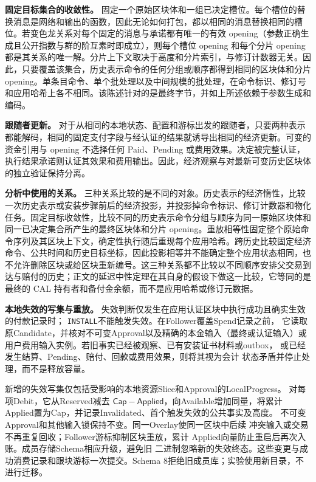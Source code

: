 \noindent\textbf{固定目标集合的收敛性。}
固定一个原始区块体和一组已决定槽位。每个槽位的替换消息是网络和输出的函数，因此无论如何打包，都以相同的消息替换相同的槽位。若变色龙关系对每个固定的消息与承诺都有唯一的有效 opening（参数正确生成且公开指数与群的阶互素时即成立），则每个槽位 opening 和每个分片 opening 都是其关系的唯一解。分片上下文取决于高度和分片索引，与修订计数器无关。因此，只要覆盖该集合，历史表示命令的任何分组或顺序都得到相同的区块体和分片 opening。单条目命令、单个批处理以及中间规模的批处理，在命令标识、修订号和应用哈希上各不相同。该陈述针对的是最终字节，并如上所述依赖于参数生成和编码。

\noindent\textbf{跟随者更新。}
对于从相同的本地状态、配置和游标出发的跟随者，只要两种表示都能解码，相同的固定支付字段与经认证的结果就诱导出相同的经济更新。可变的资金引用与 opening 不选择任何 Paid、Pending 或费用效果。决定被完整认证，执行结果承诺则认证其效果和费用输出。因此，经济观察与对最新可变历史区块体的独立验证保持分离。

\noindent\textbf{分析中使用的关系。}
三种关系比较的是不同的对象。历史表示的经济惰性，比较一次历史表示或安装步骤前后的经济投影，并投影掉命令标识、修订计数器和物化任务。固定目标收敛性，比较不同的历史表示命令分组与顺序为同一原始区块体和同一已决定集合所产生的最终区块体和分片 opening。重放相等性固定整个原始命令序列及其区块上下文，确定性执行随后重现每个应用哈希。跨历史比较固定经济命令、公共时间和历史目标坐标，因此投影相等并不能确定整个应用状态相同，也不允许删除区块或给区块重新编号。这三种关系都不比较以不同顺序安排父交易到达与赔付的历史；正文的延迟中性定理在其自身的假设下做这一比较，它等同的是最终的 CAL 持有者和备付金余额，而不是应用哈希或修订元数据。

\noindent\textbf{本地失效的写集与重放。}
失效判断仅发生在应用认证区块中执行成功且确实生效的付款记录时；
\texttt{INSTALL}不能触发失效。在Follower覆盖Spend记录之前，
它读取原Candidate，并核对不可变Approval以及精确的本金输入（最终或认证输入）或
用户费用输入实例。若旧事实已经被观察、已有安装证书材料或outbox，
或已经发生结算、Pending、赔付、回款或费用效果，则将其视为会计
状态矛盾并停止处理，而不是释放容量。

新增的失效写集仅包括受影响的本地资源Slice和Approval的LocalProgress。
对每项Debit，它从Reserved减去
$\mathsf{Cap}-\mathsf{Applied}$，向Available增加同量，将累计
Applied置为Cap，并记录Invalidated、首个触发失效的公共事实及高度。
不可变Approval和其他输入锁保持不变。同一Overlay使同一区块中后续
冲突输入或交易不再重复回收；Follower游标抑制区块重放，累计
Applied向量防止重启后再次入账。成员存储Schema相应升级，避免旧
二进制忽略新的失效终态。这些变更与成功消费记录和跟块游标一次提交。Schema 8拒绝旧成员库；实验使用新目录，不进行迁移。

